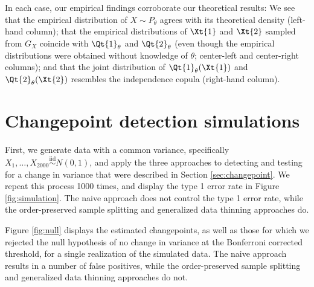 \documentclass[12pt]{article}
\begin{document}
In each case, our empirical findings corroborate our theoretical results: We see that the empirical distribution of $X \sim P_\theta$ agrees with its theoretical density (left-hand column); that the empirical distributions of $\Xt{1}$ and $\Xt{2}$ sampled from $G_X$ coincide with $\Qt{1}_\theta$ and $\Qt{2}_\theta$ (even though the empirical distributions were obtained without knowledge of $\theta$; center-left and center-right columns); and that the joint distribution of $\Qt{1}_\theta(\Xt{1})$ and $\Qt{2}_\theta(\Xt{2})$ resembles the independence copula (right-hand column). 



\section{Changepoint detection simulations} \label{app:changepoint}
First, we generate data with a common variance, specifically $X_1,\ldots,X_{2000}\overset{\text{iid}}{\sim} N(0,1)$, and apply the three approaches to detecting and testing for a change in variance that were described in Section \ref{sec:changepoint}.  
We repeat this process 1000 times, and display the type 1 error rate in Figure \ref{fig:simulation}. The naive approach does not control the type 1 error rate, while the order-preserved sample splitting and generalized data thinning approaches do. 

Figure \ref{fig:null} displays the estimated changepoints, as well as those for which we rejected the null hypothesis of no change in variance at the Bonferroni corrected threshold, for a single realization of the simulated data. The naive approach results in a number of false positives, while the order-preserved sample splitting and generalized data thinning approaches do not. 
\end{document}
